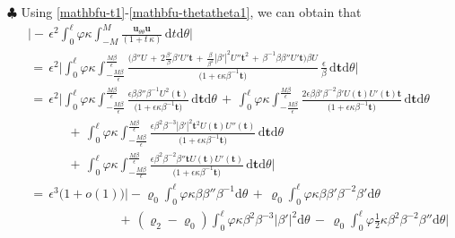 \documentclass[10pt, reqno]{amsart}
\numberwithin{equation}{section}
\theoremstyle{definition}
\begin{document}
{{\smallskip
\noindent$\clubsuit$
 Using \eqref{mathbfu-t1}-\eqref{mathbfu-thetatheta1}, we can obtain that
\begin{align*}
 &\Bigg|-\,\epsilon^2\int_0^\ell \varphi \kappa\int_{-M}^{M} \frac{{\mathbf u}_{\theta\theta}
 {\mathbf u}}{(1+t\,\kappa)}
 \,{\mathrm d}t{\mathrm d}\theta\Bigg|
\nonumber\\[2mm]
 &\,=\,\epsilon^2\Bigg|\int_0^\ell \varphi \kappa \displaystyle\int_{-\frac{M\beta}{\epsilon}}^{\frac{M\beta}{\epsilon}}
 \frac{\big(\beta''U
 \,+\, 2\frac{\beta'}{\beta}\beta' U'{\mathbf t}
 \,+\, \frac{\beta}{\beta^2} |\beta' |^2 U''{\mathbf t}^2
 \,+\, \beta^{-1}\beta\beta'' U'{\mathbf t}\big)\beta U}
 {\big(1+\epsilon \kappa \beta^{-1}{\mathbf t}\big)}
 \,\frac{\epsilon}{\beta} \,{\mathrm d}{\mathbf t}{\mathrm d}\theta\Bigg|
\nonumber\\[2mm]
 &\,=\,\epsilon^2\Bigg|\int_0^\ell \varphi \kappa \displaystyle\int_{-\frac{M\beta}{\epsilon}}^{\frac{M\beta}{\epsilon}}
 \frac{\epsilon \beta\beta''\beta^{-1}U^2({\mathbf t})}{\big(1+\epsilon \kappa \beta^{-1}{\mathbf t}\big)}
 \,{\mathrm d}{\mathbf t}{\mathrm d}\theta
 \,+\,
 \int_0^\ell \varphi \kappa \displaystyle\int_{-\frac{M\beta}{\epsilon}}^{\frac{M\beta}{\epsilon}}
 \frac{ 2\epsilon\beta\beta'\beta^{-2}\beta' U({\mathbf t})U'({\mathbf t}){\mathbf t}}{\big(1+\epsilon \kappa \beta^{-1}{\mathbf t}\big)}
 \,{\mathrm d}{\mathbf t}{\mathrm d}\theta
\nonumber\\[2mm]
 &\qquad\quad\,+\,\int_0^\ell \varphi \kappa \displaystyle\int_{-\frac{M\beta}{\epsilon}}^{\frac{M\beta}{\epsilon}}
 \frac{\epsilon \beta^2\beta^{-3}|\beta'|^2{\mathbf t}^2U({\mathbf t})U''({\mathbf t})}{\big(1+\epsilon \kappa \beta^{-1}{\mathbf t}\big)}
 \,{\mathrm d}{\mathbf t}{\mathrm d}\theta
\nonumber\\[2mm]
 &\qquad\quad\,+\,\int_0^\ell \varphi \kappa \displaystyle\int_{-\frac{M\beta}{\epsilon}}^{\frac{M\beta}{\epsilon}}
 \frac{\epsilon\beta^2\beta^{-2}\beta'' {\mathbf t} U({\mathbf t})U'({\mathbf t})}{\big(1+\epsilon \kappa \beta^{-1}{\mathbf t}\big)}
 \,{\mathrm d}{\mathbf t}{\mathrm d}\theta
 \Bigg|
\nonumber\\[2mm]
 &\,=\,\epsilon^3\big(1+o(1)\big)
 \Bigg|
 -\varrho_0\int_0^\ell \varphi \kappa \beta\beta''\beta^{-1}{\mathrm d}\theta
 \,+\,
 \varrho_0\int_0^\ell \varphi \kappa \beta\beta'\beta^{-2}\beta'{\mathrm d}\theta
\nonumber\\[2mm]
 &\qquad\qquad\qquad\quad
 \,+\,(\varrho_2-\varrho_0)\int_0^\ell \varphi \kappa \beta^2\beta^{-3}|\beta'|^2{\mathrm d}\theta
 \,-\, \varrho_0\int_0^\ell \varphi \frac12 \kappa \beta^2\beta^{-2}\beta''{\mathrm d}\theta \Bigg|

\end{align*}}}
\end{document}
